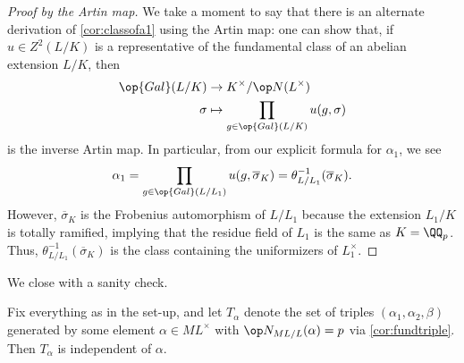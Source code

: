 \begin{proof}[Proof by the Artin map]
	We take a moment to say that there is an alternate derivation of \autoref{cor:classofa1} using the Artin map: one can show that, if $u\in Z^2(L/K)$ is a representative of the fundamental class of an abelian extension $L/K$, then
	\begin{align*}
		\op{Gal}(L/K) &\to K^\times/\op N(L^\times) \\
		\sigma &\mapsto \prod_{g\in\op{Gal}(L/K)}u(g,\sigma)
	\end{align*}
	is the inverse Artin map. In particular, from our explicit formula for $\alpha_1$, we see
	\[\alpha_1=\prod_{g\in\op{Gal}(L/L_1)}u(g,\overline\sigma_K)=\theta_{L/L_1}^{-1}(\overline\sigma_K).\]
	However, $\overline\sigma_K$ is the Frobenius automorphism of $L/L_1$ because the extension $L_1/K$ is totally ramified, implying that the residue field of $L_1$ is the same as $K=\QQ_p$. Thus, $\theta_{L/L_1}^{-1}(\overline\sigma_K)$ is the class containing the uniformizers of $L_1^\times$.
\end{proof}
We close with a sanity check.
\begin{cor}
	Fix everything as in the set-up, and let $T_\alpha$ denote the set of triples $(\alpha_1,\alpha_2,\beta)$ generated by some element $\alpha\in ML^\times$ with $\op N_{ML/L}(\alpha)=p$ via \autoref{cor:fundtriple}. Then $T_\alpha$ is independent of $\alpha$.
\end{cor}
